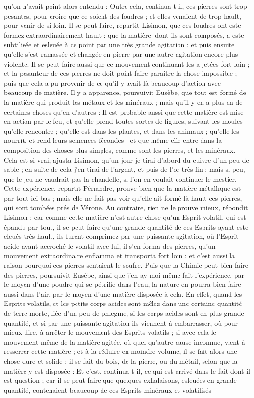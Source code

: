 \documentclass[a4paper, 11pt, oneside, polutonikogreek, french, landscape, twocolumn]{article}
\begin{document}
qu'on n'avait point alors entendu : Outre cela, continua-t-il, ces pierres sont trop pesantes, pour croire que ce soient des foudres ; et elles venaient de trop hault, pour venir de si loin. Il se peut faire, repartit Lisimon, que ces foudres ont este formez extraordinairement hault : que la matière, dont ils sont composés, a este subtilisée et esleuée à ce point par une très grande agitation ; et puis ensuite qu'elle s'est ramassée et changée en pierre par une autre agitation encore plus violente. Il se peut faire aussi que ce mouvement continuant les a jetées fort loin ; et la pesanteur de ces pierres ne doit point faire paraitre la chose impossible ; puis que cela a pu provenir de ce qu'il y avait là beaucoup d'action avec beaucoup de matière. Il y a apparence, poursuivit Eusèbe, que tout est formé de la matière qui produit les métaux et les minéraux ; mais qu'il y en a plus en de certaines choses qu'en d'autres : Il est probable aussi que cette matière est mise en action par le feu, et qu'elle prend toutes sortes de figures, suivant les moules qu'elle rencontre ; qu'elle est dans les plantes, et dans les animaux ; qu'elle les nourrit, et rend leurs semences fécondes ; et que même elle entre dans la composition des choses plus simples, comme sont les pierres, et les minéraux. Cela est si vrai, ajusta Lisimon, qu'un jour je tirai d'abord du cuivre d'un peu de sable ; en suite de cela j'en tirai de l'argent, et puis de l'or très fin ; mais si peu, que le jeu ne vaudrait pas la chandelle, si l'on en voulait continuer le mestier. Cette expérience, repartit Périandre, prouve bien que la matière métallique est par tout ici-bas ; mais elle ne fait pas voir qu'elle ait formé là hault ces pierres, qui sont tombées prés de Vérone. Au contraire, rien ne le prouve mieux, répondit Lisimon ; car comme cette matière n'est autre chose qu'un Esprit volatil, qui est épandu par tout, il se peut faire qu'une grande quantité de ces Esprits ayant este eleués très hault, ils furent comprimez par une puissante agitation, où l'Esprit acide ayant accroché le volatil avec lui, il s'en forma des pierres, qu'un mouvement extraordinaire enflamma et transporta fort loin ; et c'est aussi la raison pourquoi ces pierres sentaient le soufre. Puis que la Chimie peut bien faire des pierres, poursuivit Eusèbe, ainsi que j'en ay moi-même fait l'expérience, par le moyen d'une poudre qui se pétrifie dans l'eau, la nature en pourra bien faire aussi dans l'air, par le moyen d'une matière disposée à cela. En effet, quand les Esprits volatils, et les petits corps acides sont mêlez dans une certaine quantité de terre morte, liée d'un peu de phlegme, si les corps acides sont en plus grande quantité, et si par une puissante agitation ils viennent à embarrasser, où pour mieux dire, à arrêter le mouvement des Esprits volatils ; si avec cela le mouvement même de la matière agitée, où quel qu’autre cause inconnue, vient à resserrer cette matière ; et à la réduire en moindre volume, il se fait alors une chose dure et solide ; il se fait du bois, de la pierre, ou du métail, selon que la matière y est disposée : Et c'est, continua-t-il, ce qui est arrivé dans le fait dont il est question ; car il se peut faire que quelques exhalaisons, esleuées en grande quantité, contenaient beaucoup de ces Esprits minéraux et volatilisés 
\end{document}
